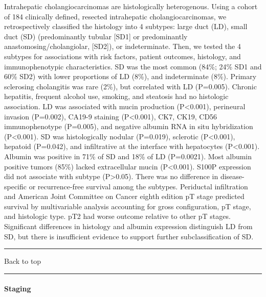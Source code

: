 \documentclass[]{article}
\let\oldparagraph\paragraph
\renewcommand{\paragraph}[1]{\oldparagraph{#1}\mbox{}}
\begin{document}
Intrahepatic cholangiocarcinomas are histologically heterogenous. Using
a cohort of 184 clinically defined, resected intrahepatic
cholangiocarcinomas, we retrospectively classified the histology into 4
subtypes: large duct (LD), small duct (SD) (predominantly tubular
{[}SD1{]} or predominantly anastomosing/cholangiolar, {[}SD2{]}), or
indeterminate. Then, we tested the 4 subtypes for associations with risk
factors, patient outcomes, histology, and immunophenotypic
characteristics. SD was the most common (84\%; 24\% SD1 and 60\% SD2)
with lower proportions of LD (8\%), and indeterminate (8\%). Primary
sclerosing cholangitis was rare (2\%), but correlated with LD (P=0.005).
Chronic hepatitis, frequent alcohol use, smoking, and steatosis had no
histologic association. LD was associated with mucin production
(P\textless{}0.001), perineural invasion (P=0.002), CA19-9 staining
(P\textless{}0.001), CK7, CK19, CD56 immunophenotype (P=0.005), and
negative albumin RNA in situ hybridization (P\textless{}0.001). SD was
histologically nodular (P=0.019), sclerotic (P\textless{}0.001),
hepatoid (P=0.042), and infiltrative at the interface with hepatocytes
(P\textless{}0.001). Albumin was positive in 71\% of SD and 18\% of LD
(P=0.0021). Most albumin positive tumors (85\%) lacked extracellular
mucin (P\textless{}0.001). S100P expression did not associate with
subtype (P\textgreater{}0.05). There was no difference in
disease-specific or recurrence-free survival among the subtypes.
Periductal infiltration and American Joint Committee on Cancer eighth
edition pT stage predicted survival by multivariable analysis accounting
for gross configuration, pT stage, and histologic type. pT2 had worse
outcome relative to other pT stages. Significant differences in
histology and albumin expression distinguish LD from SD, but there is
insufficient evidence to support further subclassification of SD.

{}

{}

\begin{center}\rule{0.5\linewidth}{\linethickness}\end{center}

Back to top

\begin{center}\rule{0.5\linewidth}{\linethickness}\end{center}

\pagebreak

\hypertarget{staging-1}{%
\paragraph{Staging}\label{staging-1}}
\end{document}
